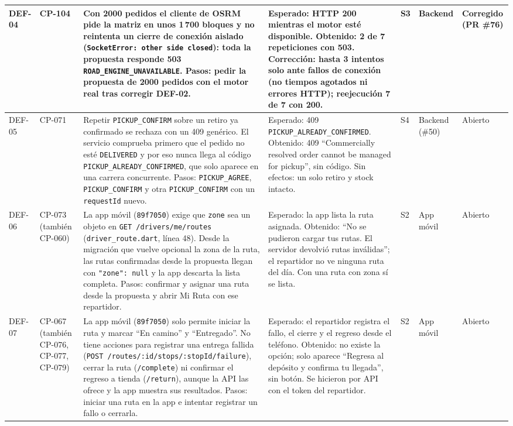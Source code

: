 \begin{center}
\begin{longtable}{|P{1.2cm}|P{1.5cm}|P{3.6cm}|P{3.2cm}|P{0.9cm}|P{1.9cm}|P{1.6cm}|}
DEF-04 & CP-104 & Con 2000 pedidos el cliente de OSRM pide la matriz en unos 1\,700 bloques y no reintenta un cierre de conexión aislado (\texttt{SocketError: other side closed}): toda la propuesta responde 503 \texttt{ROAD\_ENGINE\_UNAVAILABLE}. Pasos: pedir la propuesta de 2000 pedidos con el motor real tras corregir DEF-02. & Esperado: HTTP 200 mientras el motor esté disponible. Obtenido: 2 de 7 repeticiones con 503. Corrección: hasta 3 intentos solo ante fallos de conexión (no tiempos agotados ni errores HTTP); reejecución 7 de 7 con 200. & S3 & Backend & Corregido (PR \#76) \\ \hline
DEF-05 & CP-071 & Repetir \texttt{PICKUP\_CONFIRM} sobre un retiro ya confirmado se rechaza con un 409 genérico. El servicio comprueba primero que el pedido no esté \texttt{DELIVERED} y por eso nunca llega al código \texttt{PICKUP\_ALREADY\_CONFIRMED}, que solo aparece en una carrera concurrente. Pasos: \texttt{PICKUP\_AGREE}, \texttt{PICKUP\_CONFIRM} y otra \texttt{PICKUP\_CONFIRM} con un \texttt{requestId} nuevo. & Esperado: 409 \texttt{PICKUP\_ALREADY\_CONFIRMED}. Obtenido: 409 ``Commercially resolved order cannot be managed for pickup'', sin código. Sin efectos: un solo retiro y stock intacto. & S4 & Backend (\#50) & Abierto \\ \hline
DEF-06 & CP-073 (también CP-060) & La app móvil (\texttt{89f7050}) exige que \texttt{zone} sea un objeto en \texttt{GET /drivers/me/routes} (\texttt{driver\_route.dart}, línea 48). Desde la migración que vuelve opcional la zona de la ruta, las rutas confirmadas desde la propuesta llegan con \texttt{"zone": null} y la app descarta la lista completa. Pasos: confirmar y asignar una ruta desde la propuesta y abrir Mi Ruta con ese repartidor. & Esperado: la app lista la ruta asignada. Obtenido: ``No se pudieron cargar tus rutas. El servidor devolvió rutas inválidas''; el repartidor no ve ninguna ruta del día. Con una ruta con zona sí se lista. & S2 & App móvil & Abierto \\ \hline
DEF-07 & CP-067 (también CP-076, CP-077, CP-079) & La app móvil (\texttt{89f7050}) solo permite iniciar la ruta y marcar ``En camino'' y ``Entregado''. No tiene acciones para registrar una entrega fallida (\texttt{POST /\allowbreak{}routes/\allowbreak{}:id/\allowbreak{}stops/\allowbreak{}:stopId/\allowbreak{}failure}), cerrar la ruta (\texttt{/complete}) ni confirmar el regreso a tienda (\texttt{/return}), aunque la API las ofrece y la app muestra sus resultados. Pasos: iniciar una ruta en la app e intentar registrar un fallo o cerrarla. & Esperado: el repartidor registra el fallo, el cierre y el regreso desde el teléfono. Obtenido: no existe la opción; solo aparece ``Regresa al depósito y confirma tu llegada'', sin botón. Se hicieron por API con el token del repartidor. & S2 & App móvil & Abierto \\ \hline

\end{longtable}
\end{center}
